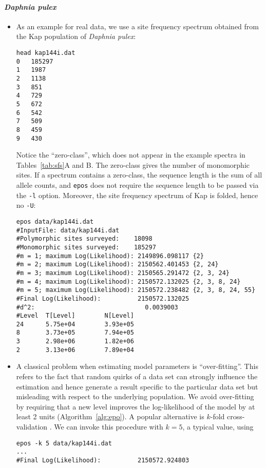 \documentclass[a4paper, english]{article}
\newcommand{\ty}{\texttt}
\begin{document}
\paragraph{\textit{Daphnia pulex}}
\begin{itemize}
\item As an example for real data, we use a site frequency spectrum obtained from
  the Kap population of \textit{Daphnia pulex}:
\begin{verbatim}
head kap144i.dat 
0	185297
1	1987
2	1138
3	851
4	729
5	672
6	542
7	509
8	459
9	430
\end{verbatim}
Notice the ``zero-class'', which does not appear in the example
spectra in Tables~\ref{tab:sfs}A and B. The zero-class gives the
number of monomorphic sites. If a spectrum contains a zero-class, the
sequence length is the sum of all allele counts, and \ty{epos} does not
require the sequence length to be passed via the \ty{-l}
option. Moreover, the site frequency spectrum of Kap is folded, hence
no \ty{-U}:
\begin{verbatim}
epos data/kap144i.dat 
#InputFile:	data/kap144i.dat
#Polymorphic sites surveyed:	18098
#Monomorphic sites surveyed:	185297
#m = 1; maximum Log(Likelihood): 2149896.098117	{2}
#m = 2; maximum Log(Likelihood): 2150562.401453	{2, 24}
#m = 3; maximum Log(Likelihood): 2150565.291472	{2, 3, 24}
#m = 4; maximum Log(Likelihood): 2150572.132025	{2, 3, 8, 24}
#m = 5; maximum Log(Likelihood): 2150572.238482	{2, 3, 8, 24, 55}
#Final Log(Likelihood):          2150572.132025
#d^2:                              0.0039003
#Level  T[Level]        N[Level]
24      5.75e+04        3.93e+05
8       3.73e+05        7.94e+05
3       2.98e+06        1.82e+06
2       3.13e+06        7.89e+04                              
\end{verbatim}
\item A classical problem when estimating model parameters is
  ``over-fitting''. This refers to the fact that random quirks of a
  data set can strongly influence the estimation and hence
  generate a result specific to the particular data set but misleading
  with respect to the underlying population. We avoid over-fitting by
  requiring that a new level improves the log-likelihood of the model
  by at least 2 units (Algorithm~\ref{alg:epo}). A popular alternative is $k$-fold
  cross-validation \citep[p. 118f]{goo16:dee}. We can invoke this
  procedure with $k=5$, a typical value, using
\begin{verbatim}
epos -k 5 data/kap144i.dat 
...
#Final Log(Likelihood):          2150572.924803

\end{verbatim}
\end{itemize}
\end{document}
